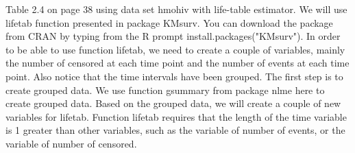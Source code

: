 	Table 2.4 on page 38 using data set hmohiv with life-table estimator. We will use lifetab function presented in package KMsurv. You can download the package from CRAN by typing from the R prompt install.packages("KMsurv"). In order to be able to use function lifetab, we need to create a couple of variables, mainly the number of censored at each time point and the number of events at each time point. Also notice that the time intervals have been grouped. The first step is to create grouped data. We use function gsummary from package nlme here to create grouped data. Based on the grouped data, we will create a couple of new variables for lifetab. Function lifetab requires that the length of the time variable is 1 greater than other variables, such as the variable of number of events, or the variable of number of censored.
